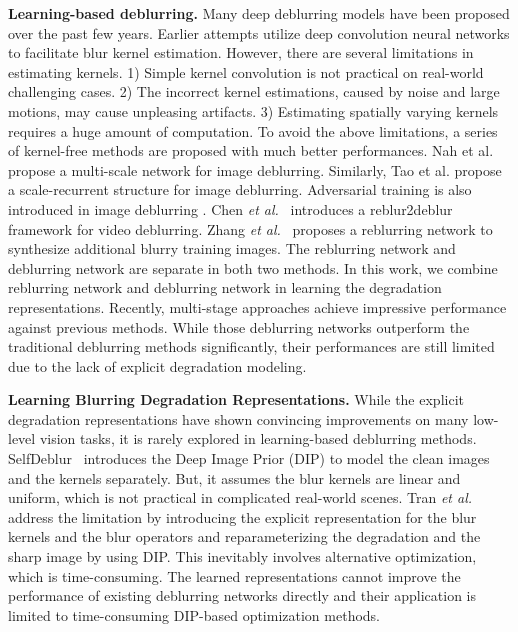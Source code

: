 \documentclass[runningheads]{llncs}
\def\etal{{\em et al.}}
\begin{document}
\noindent\textbf{Learning-based deblurring.}
Many deep deblurring models have been proposed over the past few years. 
Earlier attempts \cite{Learning_to_deblur,Learning_CNN_non_uniform} utilize deep convolution neural networks to facilitate blur kernel estimation. However, there are several limitations \cite{deblur-multi-scale} in estimating kernels. 1) Simple kernel convolution is not practical on real-world challenging cases. 2) The incorrect kernel estimations, caused by noise and large motions, may cause unpleasing artifacts. 3) Estimating spatially varying kernels requires a huge amount of computation. To avoid the above limitations, a series of kernel-free methods \cite{tao2018srndeblur,deblur-multi-scale,kupyn2018deblurgan,kupyn2019deblurgan,deepstacked,gao2019dynamic,suin2020spatially,park2020multi,zhang2020deblurring,Zamir2021MPRNet,MIMO_UNet,HINet} are proposed with much better performances. Nah et al. \cite{deblur-multi-scale} propose a multi-scale network for image deblurring. Similarly, Tao et al. \cite{tao2018srndeblur} propose a scale-recurrent structure for image deblurring. Adversarial training is also introduced in image deblurring \cite{kupyn2018deblurgan,kupyn2019deblurgan}. Chen \etal~\cite{reblur2deblur} introduces a reblur2deblur framework for video deblurring. Zhang \etal~\cite{zhang2020deblurring} proposes a reblurring network to synthesize additional blurry training images. The reblurring network and deblurring network are separate in both two methods. In this work, we combine reblurring network and deblurring network in learning the degradation representations.
Recently, multi-stage approaches \cite{deepstacked,suin2020spatially,Zamir2021MPRNet,HINet} achieve impressive performance against previous methods.
While those deblurring networks outperform the traditional deblurring methods significantly, their performances are still limited due to the lack of explicit degradation modeling. 

\noindent\textbf{Learning Blurring Degradation Representations.}
While the explicit degradation representations have shown convincing improvements on many low-level vision tasks, it is rarely explored in learning-based deblurring methods. SelfDeblur~\cite{Blind_DIP} introduces the Deep Image Prior (DIP) \cite{DIP_2018_CVPR} to model the clean images and the kernels separately. But, it assumes the blur kernels are linear and uniform, which is not practical in complicated real-world scenes. Tran \etal~\cite{Exploring_blur-CVPR21} address the limitation by introducing the explicit representation for the blur kernels and the blur operators and reparameterizing the degradation and the sharp image by using DIP. This inevitably involves alternative optimization, which is time-consuming.   
The learned representations cannot improve the performance of existing deblurring networks directly and their application is limited to time-consuming DIP-based optimization methods.
\end{document}

